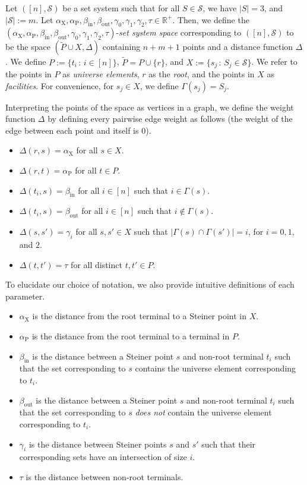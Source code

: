 \documentclass{article}\providecommand{\DeclareRedundantLanguages}[2]{}\usepackage[a4paper,margin=20mm]{geometry}
\newcommand{\R}{\mathbb{R}}
\newcommand{\1}{\textbf{1}}
\newcommand{\td}{\tau}
\newcommand{\srd}{\alpha_{\text{X}}}
\newcommand{\trd}{\alpha_{\text{P}}}
\renewcommand{\tilde}{\widetilde}
\begin{document}
\begin{definition} \label{defn: set system space}
Let $([n], \mathcal{S})$ be a set system such that for all $S \in \mathcal{S}$, we have $|S| = 3$, and $|\mathcal{S}|:= m$. Let $\srd, \trd, \beta_{\text{in}}, \beta_{\text{out}}, \gamma_0, \gamma_1, \gamma_2, \td \in \R^+$. 
Then, we define the $(\srd, \trd, \beta_{\text{in}}, \beta_{\text{out}}, \gamma_0, \gamma_1, \gamma_2, \td)$-\textit{set system space} corresponding to $([n], \mathcal{S})$ to be the space  $(\tilde{P} \cup X, \Delta)$ containing $n + m + 1$ points and a distance function $\Delta$. We define $P := \{t_i \,:\, i \in [n]\}$, $\tilde{P} = P \cup \{r\}$, and $X := \{s_j \,:\, S_j \in \mathcal{S}\}$. We refer to the points in $P$ as \textit{universe elements}, $r$ as the \textit{root}, and the points in $X$ as \textit{facilities}. For convenience, for $s_j \in X$, we define $\Gamma(s_j) = S_j$.

Interpreting the points of the space as vertices in a graph, we define the weight function $\Delta$ by defining every pairwise edge weight as follows (the weight of the edge between each point and itself is $0$).
\begin{itemize}
    \item $\Delta(r, s) = \srd$ for all $s \in X$.
    \item $\Delta(r,t) = \trd $ for all $t \in P$.
    \item $\Delta(t_i, s) = \beta_{\text{in}}$ for all $i \in [n]$ such that $i \in \Gamma(s)$.
    \item $\Delta (t_i, s) = \beta_{\text{out}} $ for all $i \in [n]$ such that $i \not\in \Gamma(s)$.
    \item $\Delta(s, s') = \gamma_i$ for all $s, s' \in X$ such that $|\Gamma(s) \cap \Gamma(s')| = i$, for $i = 0,1,$ and $2$.
    \item $\Delta(t,t') = \td$ for all distinct $t,t' \in P$.
\end{itemize}
\end{definition}

To elucidate our choice of notation, we also provide intuitive definitions of each parameter. 
\begin{itemize}
\item $\srd$ is the distance from the root terminal to a Steiner point in $X$.
    \item $\trd$ is the distance from the root terminal to a terminal in $P$.
    \item $\beta_{\text{in}}$ is the distance between a Steiner point $s$ and non-root terminal $t_i$ such that the set corresponding to $s$ contains the universe element corresponding to $t_i$. 
    \item $\beta_{\text{out}}$ is the distance between a Steiner point $s$ and non-root terminal $t_i$ such that the set corresponding to $s$ \textit{does not} contain the universe element corresponding to $t_i$.
    \item $\gamma_i$ is the distance between Steiner points $s$ and $s'$ such that their corresponding sets have an intersection of size $i$.
    \item $\tau$ is the distance between non-root terminals.
\end{itemize}
\end{document}
